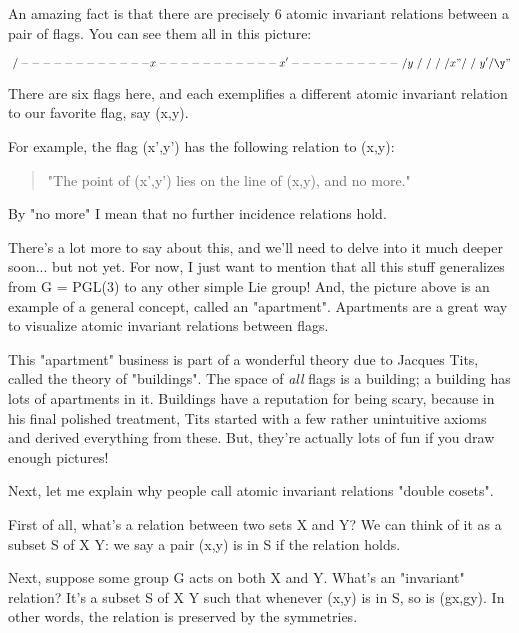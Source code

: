 An amazing fact is that there are precisely 6 atomic invariant relations 
between a pair of flags.  You can see them all in this picture:


$$

                 \             /
      ------------x-----------x'----------
                   \         /         y
                    \       /
                     \     /
                      \   /
                       \ /
                        x"
                       / \
                      /   \
                   y'/     \y"
$$
    
There are six flags here, and each exemplifies a different
atomic invariant relation to our favorite flag, say (x,y).

For example, the flag (x',y') has the following relation to (x,y):

\begin{quote}
   "The point of (x',y') lies on the line of (x,y), and no more."
\end{quote}
By "no more" I mean that no further incidence relations hold.

There's a lot more to say about this, and we'll need to delve into
it much deeper soon... but not yet.  For now, I just want to mention 
that all this stuff generalizes from G = PGL(3) to any other simple 
Lie group!  And, the picture above is an example of a general concept, 
called an "apartment".  Apartments are a great way to visualize 
atomic invariant relations between flags.

This "apartment" business is part of a wonderful theory due
to Jacques Tits, called the theory of "buildings".  The
space of \emph{all} flags is a building; a building has lots of apartments
in it.  Buildings have a reputation for being scary, because in his
final polished treatment, Tits started with a few rather unintuitive
axioms and derived everything from these.  But, they're actually lots
of fun if you draw enough pictures!

Next, let me explain why people call atomic invariant relations
"double cosets".

First of all, what's a relation between two sets X and Y?  We can
think of it as a subset S of X \times  Y: we say a pair (x,y) is in S
if the relation holds.

Next, suppose some group G acts on both X and Y.  What's an
"invariant" relation?  It's a subset S of X \times  Y such
that whenever (x,y) is in S, so is (gx,gy).  In other words, the
relation is preserved by the symmetries.

